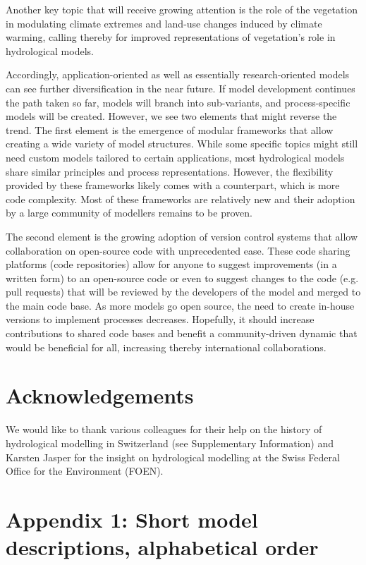 \documentclass[10pt,a4paper]{article}
\begin{document}
Another key topic that will receive growing attention is the role of the vegetation in modulating climate extremes \citep{Mastrotheodoros2020} and land-use changes induced by climate warming, calling thereby for improved representations of vegetation's role in hydrological models.

Accordingly, application-oriented as well as essentially research-oriented models can see further diversification in the near future. If model development continues the path taken so far, models will branch into sub-variants, and process-specific models will be created. However, we see two elements that might reverse the trend. The first element is the emergence of modular frameworks that allow creating a wide variety of model structures. While some specific topics might still need custom models tailored to certain applications, most hydrological models share similar principles and process representations. However, the flexibility provided by these frameworks likely comes with a counterpart, which is more code complexity. Most of these frameworks are relatively new and their adoption by a large community of modellers remains to be proven.

The second element is the growing adoption of version control systems that allow collaboration on open-source code with unprecedented ease. These code sharing platforms (code repositories) allow for anyone to suggest improvements (in a written form) to an open-source code or even to suggest changes to the code (e.g. pull requests) that will be reviewed by the developers of the model and merged to the main code base. As more models go open source, the need to create in-house versions to implement processes decreases. Hopefully, it should increase contributions to shared code bases and benefit a community-driven dynamic that would be beneficial for all, increasing thereby international collaborations.


\section*{Acknowledgements}

We would like to thank various colleagues for their help on the history of hydrological modelling in Switzerland (see Supplementary Information) and Karsten Jasper for the insight on hydrological modelling at the Swiss Federal Office for the Environment (FOEN).


\section*{Appendix 1: Short model descriptions, alphabetical order}
\label{appendix:1}
\end{document}
